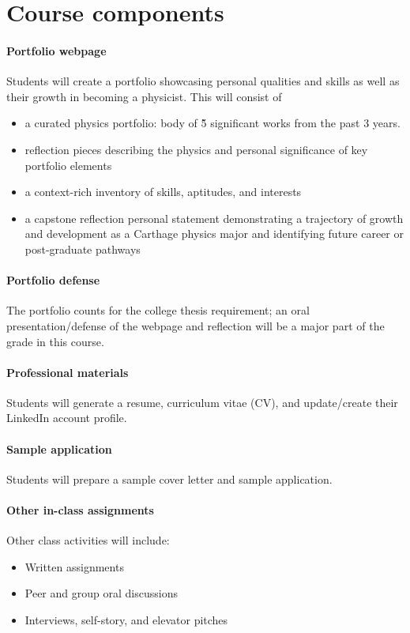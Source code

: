\documentclass{syllabus}
\begin{document}
\section*{Course components}

\paragraph{Portfolio webpage}
Students will create a portfolio showcasing personal qualities and skills as well as their growth in becoming a physicist. This will consist of
\begin{itemize}
    \item a curated physics portfolio: body of \~5 significant works from the past 3 years.
    \item reflection pieces describing the physics and personal significance of key portfolio elements
    \item a context-rich inventory of skills, aptitudes, and interests
    \item a capstone reflection personal statement demonstrating a trajectory of growth and development as a Carthage physics major and identifying future career or post-graduate pathways
\end{itemize}

\paragraph{Portfolio defense}
The portfolio counts for the college thesis requirement; an oral presentation/defense of the webpage and reflection will be a major part of the grade in this course.

\paragraph{Professional materials}
Students will generate a resume, curriculum vitae (CV), and update/create their LinkedIn account profile.

\paragraph{Sample application}
Students will prepare a sample cover letter and sample application.

\paragraph{Other in-class assignments}
Other class activities will include:
\begin{itemize}
    \item Written assignments
    \item Peer and group oral discussions
    \item Interviews, self-story, and elevator pitches
\end{itemize}
\end{document}
